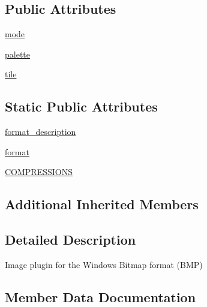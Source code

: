 \subsection*{Public Attributes}
\begin{DoxyCompactItemize}
\item 
\hyperlink{classPIL_1_1BmpImagePlugin_1_1BmpImageFile_a2e26cf178eb16a27ce5c36b4be87941c}{mode}
\item 
\hyperlink{classPIL_1_1BmpImagePlugin_1_1BmpImageFile_ad153330a84fc97024135c16bf96ed348}{palette}
\item 
\hyperlink{classPIL_1_1BmpImagePlugin_1_1BmpImageFile_af9ebbcf92d6b053043efe2816fc3b01d}{tile}
\end{DoxyCompactItemize}
\subsection*{Static Public Attributes}
\begin{DoxyCompactItemize}
\item 
\hyperlink{classPIL_1_1BmpImagePlugin_1_1BmpImageFile_a17d0c7ef14d0276649ab243e28aecd82}{format\+\_\+description}
\item 
\hyperlink{classPIL_1_1BmpImagePlugin_1_1BmpImageFile_a5e7227686232718a0d2754eca4958281}{format}
\item 
\hyperlink{classPIL_1_1BmpImagePlugin_1_1BmpImageFile_a7a9e6301baa826bc7217f44b19edbdc1}{C\+O\+M\+P\+R\+E\+S\+S\+I\+O\+NS}
\end{DoxyCompactItemize}
\subsection*{Additional Inherited Members}


\subsection{Detailed Description}
\begin{DoxyVerb}Image plugin for the Windows Bitmap format (BMP) \end{DoxyVerb}
 

\subsection{Member Data Documentation}
\mbox{\label{classPIL_1_1BmpImagePlugin_1_1BmpImageFile_a7a9e6301baa826bc7217f44b19edbdc1}} 
